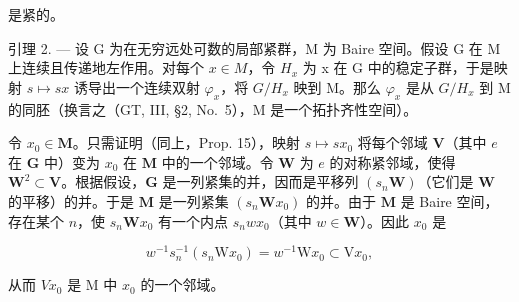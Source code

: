是紧的。

引理 2. --- 设 G 为在无穷远处可数的局部紧群，M 为 Baire 空间。假设 G 在 M 上连续且传递地左作用。对每个 \(x \in M\)，令 \(H_{x}\) 为 x 在 G 中的稳定子群，于是映射 \(s \mapsto sx\) 诱导出一个连续双射 \(\varphi_{x}\)，将 \(G/H_{x}\) 映到 M。那么 \(\varphi_{x}\) 是从 \(G/H_{x}\) 到 M 的同胚（换言之（GT, III, §2, No.~5），M 是一个拓扑齐性空间）。

令 \(x_0 \in \mathbf{M}\)。只需证明（同上，Prop. 15），映射 \(s \mapsto sx_0\) 将每个邻域 \(\mathbf{V}\)（其中 \(e\) 在 \(\mathbf{G}\) 中）变为 \(x_0\) 在 \(\mathbf{M}\) 中的一个邻域。令 \(\mathbf{W}\) 为 \(e\) 的对称紧邻域，使得 \(\mathbf{W}^2 \subset \mathbf{V}\)。根据假设，\(\mathbf{G}\) 是一列紧集的并，因而是平移列 \((s_n\mathbf{W})\)（它们是 \(\mathbf{W}\) 的平移）的并。于是 \(\mathbf{M}\) 是一列紧集 \((s_n\mathbf{W}x_0)\) 的并。由于 \(\mathbf{M}\) 是 Baire 空间，存在某个 \(n\)，使 \(s_n\mathbf{W}x_0\) 有一个内点 \(s_nwx_0\)（其中 \(w \in \mathbf{W}\)）。因此 \(x_0\) 是

\[
w ^ {- 1} s _ {n} ^ {- 1} (s _ {n} \mathrm{W} x _ {0}) = w ^ {- 1} \mathrm{W} x _ {0} \subset \mathrm{V} x _ {0},
\]

从而 \(Vx_{0}\) 是 M 中 \(x_{0}\) 的一个邻域。


